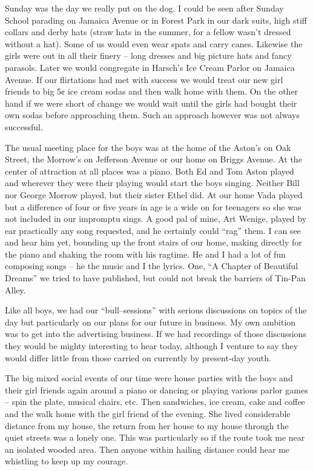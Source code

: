 \documentclass[12pt]{book}              %
\begin{document}
Sunday was the day we really put on the dog. I could be seen after Sunday School parading on Jamaica Avenue or in Forest Park in our dark suits, high stiff collars and derby hats (straw hats in the summer, for a fellow wasn't dressed without a hat). Some of us would even wear spats and carry canes. Likewise the girls were out in all their finery -- long dresses and big picture hats and fancy parasols. Later we would congregate in Harsch's Ice Cream Parlor on Jamaica Avenue. If our flirtations had met with success we would treat our new girl friends to big 5$\cent$ ice cream sodas and then walk home with them. On the other hand if we were short of change we would wait until the girls had bought their own sodas before approaching them. Such an approach however was not always successful. 

The usual meeting place for the boys was at the home of the Aston's on Oak Street, the Morrow's on Jefferson Avenue or our home on Briggs Avenue. At the center of attraction at all places was a piano. Both Ed and Tom Aston played and wherever they were their playing would start the boys singing. Neither Bill nor George Morrow played, but their sister Ethel did. At our home Vada played but a difference of four or five years in age is a wide on for teenagers so she was not included in our impromptu sings. A good pal of mine, Art Wenige, played by ear practically any song requested, and he certainly could ``rag'' them. I can see and hear him yet, bounding up the front stairs of our home, making directly for the piano and shaking the room with his ragtime. He and I had a lot of fun composing songs -- he the music and I the lyrics. One, ``A Chapter of Beautiful Dreams'' we tried to have published, but could not break the barriers of Tin-Pan Alley. 

Like all boys, we had our ``bull--sessions'' with serious discussions on topics of the day but particularly on our plans for our future in business. My own ambition was to get into the advertising business. If we had recordings of those discussions they would be mighty interesting to hear today, although I venture to say they would differ little from those carried on currently by present-day youth.

The big mixed social events of our time were house parties with the boys and their girl friends again around a piano or dancing or playing various parlor games -- spin the plate, musical chairs, etc. Then sandwiches, ice cream, cake and coffee and the walk home with the girl friend of the evening. She lived considerable distance from my house, the return from her house to my house through the quiet streets was a lonely one. This was particularly so if the route took me near an isolated wooded area. Then anyone within hailing distance could hear me whistling to keep up my courage. 
\end{document}
